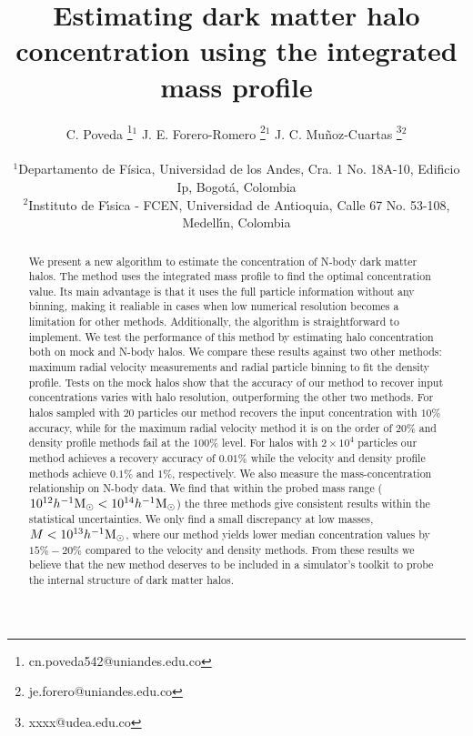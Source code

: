 \documentclass[a4,useAMS,usenatbib,usegraphicx]{mn2e}
\newcommand{\hMsun}{{\ifmmode{h^{-1}{\rm {M_{\odot}}}}\else{$h^{-1}{\rm{M_{\odot}}}$}\fi}}
\begin{document}
\title[Halo concentration from the mass profile]{Estimating dark matter
  halo concentration using the integrated mass profile} 
\author[C. Poveda, J.E. Forero-Romero, J.C. Mu\~noz-Cuartas]{
\parbox[t]{\textwidth}{\raggedright 
  C. Poveda \thanks{cn.poveda542@uniandes.edu.co}$^{1}$
  J. E. Forero-Romero \thanks{je.forero@uniandes.edu.co}$^{1}$
  J. C. Mu\~noz-Cuartas \thanks{xxxx@udea.edu.co}$^{2}$
}
\vspace*{6pt}\\
$^1$Departamento de F\'{i}sica, Universidad de los Andes, Cra. 1
No. 18A-10, Edificio Ip, Bogot\'a, Colombia\\
$^2$Instituto de F\'{\i}sica - FCEN, Universidad de Antioquia, Calle
67 No. 53-108, Medell\'{\i}n, Colombia
}

\maketitle

\begin{abstract}
We present a new algorithm to estimate the concentration of N-body
dark matter halos.
The method uses the integrated mass profile to find the optimal
concentration value. 
Its main advantage is that it uses the full particle information
without any binning, making it realiable in  cases when low numerical
resolution becomes a limitation for other methods.  
Additionally, the algorithm is straightforward to implement.  
We test the performance of this method by estimating halo
concentration both on mock and N-body halos. 
We compare these results against two other methods:
maximum radial velocity measurements and radial particle binning to
fit the density profile. 
Tests on  the mock halos show that the accuracy of our method to recover input
concentrations varies with halo resolution, outperforming the other
two methods. For halos
sampled with $20$ particles our method recovers the input
concentration with $10\%$ accuracy, while for the maximum radial
velocity method it is on the order of $20\%$ 
and density profile methods fail at the $100\%$ level.
For halos with $2\times 10^4$ particles our method achieves a recovery
accuracy of $0.01\%$ while the velocity and density profile methods
achieve $0.1\%$ and $1\%$, respectively. 
We also measure the mass-concentration relationship on N-body
data. We find that within the probed mass range ($10^{12}\hMsun <
10^{14}\hMsun$) the three methods give consistent results within the
statistical uncertainties.   
We only find a small discrepancy at low masses, $M<10^{13}\hMsun$, where
our method yields lower median concentration values by $15\%-20\%$
compared to the velocity and density methods. 
From these results we believe that the new method deserves to be
included in a simulator's toolkit to probe the internal structure of
dark matter halos.
\end{abstract}
\end{document}
